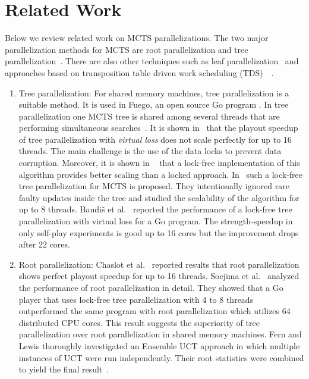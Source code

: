 \documentclass[10pt, conference, compsocconf]{IEEEtran}
\begin{document}
\section{Related Work}
\label{sec:related}
Below we review related work on MCTS parallelizations.
The two major parallelization methods for MCTS are root parallelization and tree
parallelization~\cite{Chaslot2008}. There are also other techniques such as leaf
parallelization~\cite{Chaslot2008} and approaches based on transposition table driven
work scheduling (TDS)~\cite{Yoshizoe2011a}~\cite{Romein99}.
\begin{enumerate}


\item Tree parallelization:
For shared memory machines, tree parallelization is a suitable method. It is used in {\sc Fuego}, an open source Go program \cite{Enzenberger2010b}. In tree parallelization one MCTS tree is shared among several threads that are performing simultaneous searches~\cite{Chaslot2008}. It is shown in~\cite{Chaslot2008} that the playout speedup of tree parallelization with \textit{virtual loss} does not scale perfectly for up to 16 threads. The main challenge is the use of the data locks to prevent data corruption. Moreover, it is shown in ~\cite{Enzenberger2010a} that a lock-free implementation of this algorithm provides better scaling than a locked approach. In~\cite{Enzenberger2010a} such a lock-free tree parallelization for MCTS is proposed. They intentionally ignored rare faulty updates inside the tree and studied the scalability of the algorithm for up to 8 threads. Baudi\v{s} et al.~\cite{citeulike:10600156} reported the performance of a lock-free tree parallelization with virtual loss for a Go program. The strength-speedup in only self-play experiments is good up to 16 cores but the improvement drops after 22 cores. 

\item Root parallelization:
Chaslot et al.~\cite{Chaslot2008} reported results that root parallelization shows perfect playout speedup for up to 16 threads.
Soejima et al.~\cite{Soejima2010} analyzed the performance of root parallelization in detail. They showed that a Go player that uses lock-free tree parallelization with 4 to 8 threads outperformed the same program with root parallelization which utilizes 64 distributed CPU cores. This result suggests the superiority of tree parallelization over root parallelization in shared memory machines.
Fern and Lewis‍ thoroughly investigated an Ensemble UCT
approach in which multiple instances of UCT were run independently. 
Their root statistics were combined to yield the final result~\cite{fern2011ensemble}. 
\end{enumerate}
\end{document}
